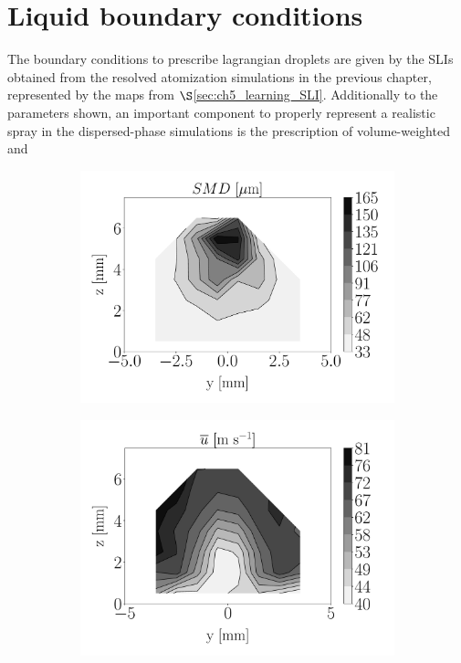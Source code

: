 \section{Liquid boundary conditions}

The boundary conditions to prescribe lagrangian droplets are given by the SLIs obtained from the resolved atomization simulations in the previous chapter, represented by the maps from $\S$\ref{sec:ch5_learning_SLI}. Additionally to the parameters shown, an important component to properly represent a realistic spray in the dispersed-phase simulations is the prescription of volume-weighted and 




\begin{figure}[h!]
\flushleft
\begin{subfigure}[b]{0.2\textwidth}
	\flushleft
	\hspace*{-0.45in}
   \includegraphics[scale=0.19]{./part2_developments/figures_ch6_lagrangian_JICF/injectors_SLI/uG100_dx10_x05_SMD_map}
\end{subfigure}
\hspace*{0.075in}
\begin{subfigure}[b]{0.2\textwidth}
	\flushleft
   \includegraphics[scale=0.19]{./part2_developments/figures_ch6_lagrangian_JICF/injectors_SLI/uG100_dx10_x05_ux_mean_map}

\end{subfigure}
\end{figure}

